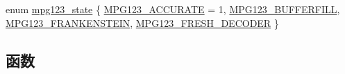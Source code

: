 \begin{DoxyCompactItemize}
\item 
enum \hyperlink{group__mpg123__status_gadfc90f3072f8c1fe32dd88854f6afb28}{mpg123\+\_\+state} \{ \hyperlink{group__mpg123__status_ggadfc90f3072f8c1fe32dd88854f6afb28a3b60be4690824a19084f134254019dfb}{M\+P\+G123\+\_\+\+A\+C\+C\+U\+R\+A\+TE} = 1, 
\hyperlink{group__mpg123__status_ggadfc90f3072f8c1fe32dd88854f6afb28a54c2be407f25a8261af7121081be11c2}{M\+P\+G123\+\_\+\+B\+U\+F\+F\+E\+R\+F\+I\+LL}, 
\hyperlink{group__mpg123__status_ggadfc90f3072f8c1fe32dd88854f6afb28ab0699a32eb0eea669e8175f1f8554209}{M\+P\+G123\+\_\+\+F\+R\+A\+N\+K\+E\+N\+S\+T\+E\+IN}, 
\hyperlink{group__mpg123__status_ggadfc90f3072f8c1fe32dd88854f6afb28af79c0a2d6cc022956d13d9710c1527e3}{M\+P\+G123\+\_\+\+F\+R\+E\+S\+H\+\_\+\+D\+E\+C\+O\+D\+ER}
 \}
\end{DoxyCompactItemize}
\subsection*{函数}
